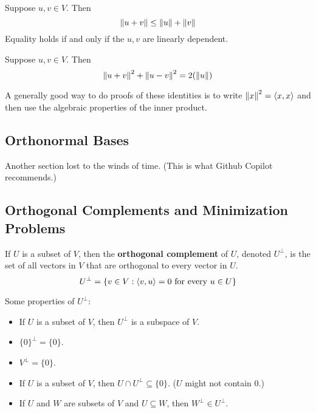 \begin{theorem} 
    Suppose $u, v \in V$. Then
    \[ \norm{u + v} \leq \norm{u} + \norm{v} \]
    Equality holds if and only if the $u, v$ are linearly dependent.
\end{theorem}

\begin{theorem} 
    Suppose $u, v \in V$. Then
    \[ \norm{u + v}^2 + \norm{u - v}^2 = 2(\norm{u}) \]
\end{theorem}

A generally good way to do proofs of these identities is to write $\norm{x}^2 = \left\langle x , x \right\rangle$ and then
use the algebraic properties of the inner product.

\subsection{Orthonormal Bases}

Another section lost to the winds of time. (This is what Github Copilot recommends.)

\subsection{Orthogonal Complements and Minimization Problems}

\begin{definition} 
    If $U$ is a subset of $V$, then the \textbf{orthogonal complement} of $U$, denoted $U^\perp$, is the set of all
    vectors in $V$ that are orthogonal to every vector in $U$.
    \[ U^\perp = \{v \in V : \left\langle v, u \right\rangle = 0 \text{ for every } u \in U\} \]
\end{definition}

\begin{theorem}
    Some properties of $U^\perp$:
    \begin{itemize}
        \item If $U$ is a subset of $V$, then $U^\perp$ is a subspace of $V$.
        \item $\{0\}^\perp = \{0\}$.
        \item $V^\perp = \{0\}$.
        \item If $U$ is a subset of $V$, then $U \cap U^\perp \subseteq \{0\}$. ($U$ might not contain $0$.)
        \item If $U$ and $W$ are subsets of $V$ and $U \subseteq W$, then $W^\perp \in U^\perp$.
    \end{itemize}
\end{theorem}

